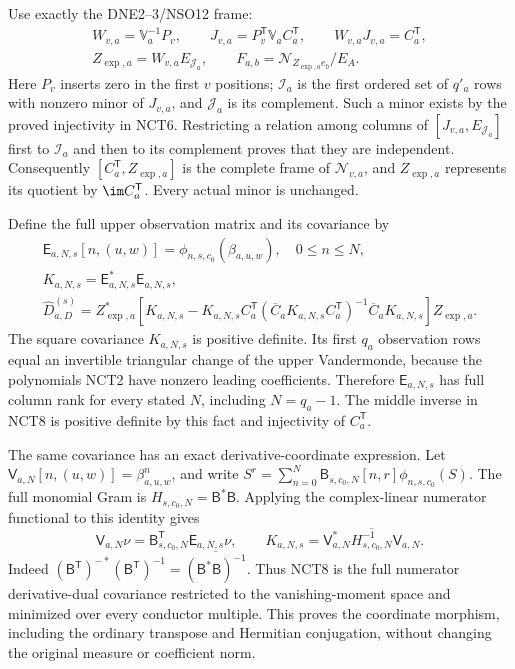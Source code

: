 \documentclass[11pt,a4paper]{article}
\begin{document}
Use exactly the DNE2--3/NSO12 frame:
\[
\begin{gathered}
 W_{v,a}=\mathbb V_a^{-1}P_v,\qquad
 J_{v,a}=P_v^{\mathsf T}\mathbb V_a C_a^{\mathsf T},
 \qquad W_{v,a}J_{v,a}=C_a^{\mathsf T},\\
 Z_{\exp,a}=W_{v,a}E_{\mathcal J_a},\qquad
 F_{a,b}=\mathcal N_{Z_{\exp,a}e_b}/E_A .
\end{gathered}\tag{NCT7}
\]
Here \(P_v\) inserts zero in the first \(v\) positions;
\(\mathcal I_a\) is the first ordered set of \(q'_a\) rows
with nonzero minor of \(J_{v,a}\), and \(\mathcal J_a\) is its
complement.  Such a minor exists by the proved injectivity in NCT6.
Restricting a relation among columns of
\([J_{v,a},E_{\mathcal J_a}]\) first to \(\mathcal I_a\) and
then to its complement proves that they are independent.
Consequently \([C_a^{\mathsf T},Z_{\exp,a}]\) is the complete
frame of \(\mathscr N_{v,a}\), and \(Z_{\exp,a}\) represents its
quotient by \(\im C_a^{\mathsf T}\).  Every actual minor is unchanged.

Define the full upper observation matrix and its covariance by
\[
\begin{gathered}
 \mathsf E_{a,N,s}[n,(u,w)]=\phi_{n,s,c_0}(\beta_{a,u,w}),
 \quad 0\le n\le N,\\
 K_{a,N,s}=\mathsf E_{a,N,s}^*\mathsf E_{a,N,s},\\
 \widehat D_{a,D}^{(s)}=Z_{\exp,a}^*
 \left[K_{a,N,s}-K_{a,N,s}C_a^{\mathsf T}
  (\overline C_a K_{a,N,s}C_a^{\mathsf T})^{-1}
              \overline C_a K_{a,N,s}\right]Z_{\exp,a}.
\end{gathered}\tag{NCT8}
\]
The square covariance \(K_{a,N,s}\) is positive definite.  Its first
\(q_a\) observation rows equal an invertible triangular change of
the upper Vandermonde, because the polynomials NCT2 have nonzero
leading coefficients.  Therefore \(\mathsf E_{a,N,s}\) has full
column rank for every stated \(N\), including \(N=q_a-1\).
The middle inverse in NCT8 is positive definite by this fact and
injectivity of \(C_a^{\mathsf T}\).

The same covariance has an exact derivative-coordinate expression.
Let \(\mathsf V_{a,N}[n,(u,w)]=\beta_{a,u,w}^{n}\), and write
\(S^r=\sum_{n=0}^N\mathsf B_{s,c_0,N}[n,r]\phi_{n,s,c_0}(S)\).
The full monomial Gram is \(H_{s,c_0,N}=\mathsf B^*\mathsf B\).
Applying the complex-linear numerator functional to this identity gives
\[
 \mathsf V_{a,N}\nu=\mathsf B_{s,c_0,N}^{\mathsf T}
                          \mathsf E_{a,N,s}\nu,\qquad
 K_{a,N,s}=\mathsf V_{a,N}^*
                \overline{H_{s,c_0,N}^{-1}}\mathsf V_{a,N}.
 \tag{NCT8a}
\]
Indeed \((\mathsf B^{\mathsf T})^{-*}(\mathsf B^{\mathsf T})^{-1}
=\overline{(\mathsf B^*\mathsf B)^{-1}}\).  Thus NCT8 is the full
numerator derivative-dual covariance restricted to the vanishing-moment
space and minimized over every conductor multiple.  This proves the
coordinate morphism, including the ordinary transpose and Hermitian
conjugation, without changing the original measure or coefficient norm.
\end{document}
